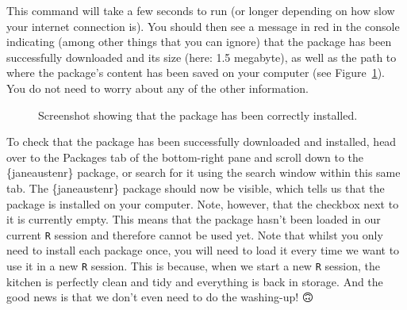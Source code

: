 \documentclass[
  letterpaper,
  DIV=11,
  numbers=noendperiod]{scrreprt}
\begin{document}
This command will take a few seconds to run (or longer depending on how
slow your internet connection is). You should then see a message in red
in the console indicating (among other things that you can ignore) that
the package has been successfully downloaded and its size (here: 1.5
megabyte), as well as the path to where the package's content has been
saved on your computer (see Figure~\ref{fig-PckInstalled}). You do not
need to worry about any of the other information.

\begin{figure}


\caption{\label{fig-PckInstalled}Screenshot showing that the package has
been correctly installed.}

\end{figure}%

To check that the package has been successfully downloaded and
installed, head over to the Packages tab of the bottom-right pane and
scroll down to the \{janeaustenr\} package, or search for it using the
search window within this same tab. The \{janeaustenr\} package should
now be visible, which tells us that the package is installed on your
computer. Note, however, that the checkbox next to it is currently
empty. This means that the package hasn't been loaded in our current
\texttt{R} session and therefore cannot be used yet. Note that whilst
you only need to install each package once, you will need to load it
every time we want to use it in a new \texttt{R} session. This is
because, when we start a new \texttt{R} session, the kitchen is
perfectly clean and tidy and everything is back in storage. And the good
news is that we don't even need to do the washing-up! 🙃
\end{document}
